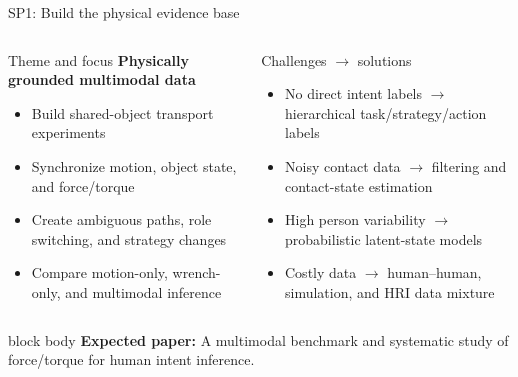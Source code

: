 \documentclass[aspectratio=169,11pt]{beamer}
\newcommand{\paperout}[1]{%
  \begin{beamercolorbox}[rounded=true,sep=0.55em,wd=\linewidth]{block body}
    \footnotesize\textbf{Expected paper:} #1
  \end{beamercolorbox}}
\begin{document}
\begin{frame}{SP1: Build the physical evidence base}
\footnotesize
\begin{columns}[T,onlytextwidth]
\begin{block}{Theme and focus}
\textbf{Physically grounded multimodal data}
\begin{itemize}
  \item Build shared-object transport experiments
  \item Synchronize motion, object state, and force/torque
  \item Create ambiguous paths, role switching, and strategy changes
  \item Compare motion-only, wrench-only, and multimodal inference
\end{itemize}
\end{block}
\begin{alertblock}{Challenges $\rightarrow$ solutions}
\begin{itemize}
  \item No direct intent labels $\rightarrow$ hierarchical task/strategy/action labels
  \item Noisy contact data $\rightarrow$ filtering and contact-state estimation
  \item High person variability $\rightarrow$ probabilistic latent-state models
  \item Costly data $\rightarrow$ human--human, simulation, and HRI data mixture
\end{itemize}
\end{alertblock}
\end{columns}
\vspace{0.18cm}
\paperout{A multimodal benchmark and systematic study of force/torque for human intent inference.}
\end{frame}
\end{document}
